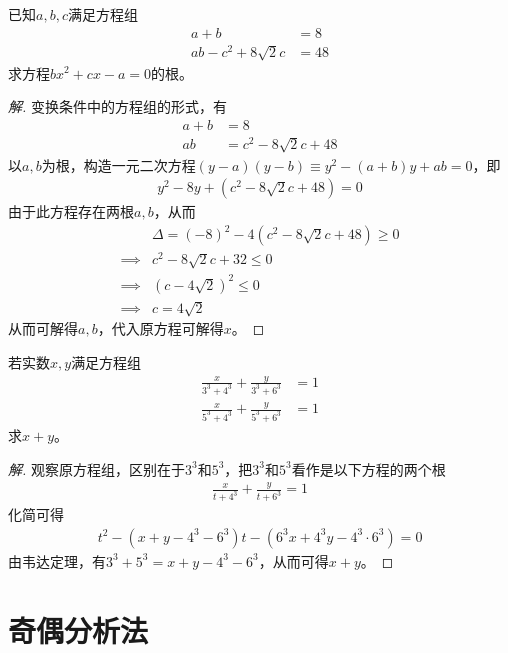 \begin{example}
  已知$a,b,c$满足方程组
  \begin{align*}
    a+b&=8\\
    ab-c^2+8\sqrt2c&=48
  \end{align*}
  求方程$bx^2+cx-a=0$的根。
\end{example}
\begin{proof}[解]
  变换条件中的方程组的形式，有
  \begin{align*}
    a+b&=8\\
    ab&=c^2-8\sqrt2c+48
  \end{align*}
  以$a,b$为根，构造一元二次方程$(y-a)(y-b)\equiv y^2 - (a+b)y + ab = 0$，即
  \begin{align*}
    y^2 - 8y + (c^2-8\sqrt2c+48) = 0
  \end{align*}
  由于此方程存在两根$a,b$，从而
  \begin{align*}
    & \Delta = (-8)^2 -4(c^2-8\sqrt2c + 48)\ge 0\\
    \implies& c^2-8\sqrt2c + 32\le 0\\
    \implies& \left(c-4\sqrt2\right)^2\le 0\\
    \implies& c=4\sqrt2
  \end{align*}
  从而可解得$a,b$，代入原方程可解得$x$。
\end{proof}


\begin{example}
  若实数$x,y$满足方程组
  \begin{align*}
    \frac{x}{3^3+4^3} + \frac{y}{3^3+6^3} &= 1\\[3pt]
    \frac{x}{5^3+4^3} + \frac{y}{5^3+6^3} &= 1
  \end{align*}
  求$x+y$。
\end{example}
\begin{proof}[解]
  观察原方程组，区别在于$3^3$和$5^3$，把$3^3$和$5^3$看作是以下方程的两个根
  \begin{align*}
    \frac{x}{t+4^3} + \frac{y}{t+6^3} = 1
  \end{align*}
  化简可得
  \begin{align*}
    t^2 - (x+y-4^3-6^3)t - (6^3x + 4^3y - 4^3\cdot 6^3)=0
  \end{align*}
  由韦达定理，有$3^3+5^3=x+y-4^3-6^3$，从而可得$x+y$。
\end{proof}


\section{奇偶分析法}
\label{sec:even-odd-method}

